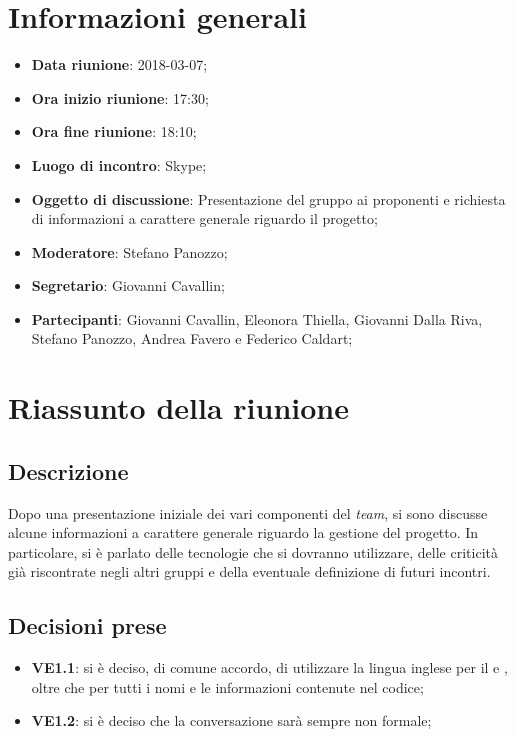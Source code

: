\section{Informazioni generali}
	\begin{itemize}
		\item \textbf{Data riunione}: 2018-03-07;
		\item \textbf{Ora inizio riunione}: 17:30;
		\item \textbf{Ora fine riunione}: 18:10;
		\item \textbf{Luogo di incontro}: Skype;
		\item \textbf{Oggetto di discussione}: Presentazione del gruppo ai proponenti e richiesta di informazioni a carattere generale riguardo il progetto;
		\item \textbf{Moderatore}: Stefano Panozzo;
		\item \textbf{Segretario}: Giovanni Cavallin;
		\item \textbf{Partecipanti}: Giovanni Cavallin, Eleonora Thiella, Giovanni Dalla Riva, Stefano Panozzo, Andrea Favero e Federico Caldart;
	\end{itemize}

\section{Riassunto della riunione}
	\subsection{Descrizione}
	Dopo una presentazione iniziale dei vari componenti del \emph{team}, si sono discusse alcune informazioni a carattere generale riguardo la gestione del progetto. In particolare, si è parlato delle tecnologie che si dovranno utilizzare, delle criticità già riscontrate negli altri gruppi e della eventuale definizione di futuri incontri.
	\subsection{Decisioni prese}
		\begin{itemize}
			\item \textbf{VE1.1}: si è deciso, di comune accordo, di utilizzare la lingua inglese per il \MU{} e \MS{}, oltre che per tutti i nomi e le informazioni contenute nel codice;
			\item \textbf{VE1.2}: si è deciso che la conversazione sarà sempre non formale;
		\end{itemize}